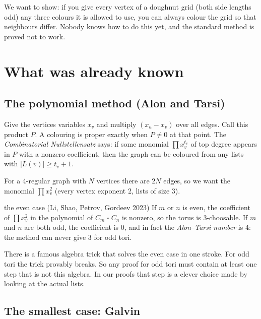 \documentclass[11pt,oneside,openany]{book}
\newcommand{\T}{\mathbin{\square}}
\begin{document}
\begin{plainwords}
We want to show: if you give every vertex of a doughnut grid (both side lengths odd) any three
colours it is allowed to use, you can always colour the grid so that neighbours differ. Nobody
knows how to do this yet, and the standard method is proved not to work.
\end{plainwords}

\chapter{What was already known}

\section{The polynomial method (Alon and Tarsi)}

Give the vertices variables $x_v$ and multiply $(x_u - x_v)$ over all edges. Call this product
$P$. A colouring is proper exactly when $P \neq 0$ at that point. The \emph{Combinatorial
Nullstellensatz} says: if some monomial $\prod x_v^{t_v}$ of top degree appears in $P$ with a
nonzero coefficient, then the graph can be coloured from any lists with $|L(v)| \ge t_v + 1$.

For a 4-regular graph with $N$ vertices there are $2N$ edges, so we want the monomial
$\prod x_v^2$ (every vertex exponent 2, lists of size 3).

\begin{proved}{the even case (Li, Shao, Petrov, Gordeev 2023)}
If $m$ or $n$ is even, the coefficient of $\prod x_v^2$ in the polynomial of $C_m \T C_n$ is
nonzero, so the torus is 3-choosable. If $m$ and $n$ are both odd, the coefficient is $0$, and in
fact the \emph{Alon--Tarsi number} is 4: the method can never give 3 for odd tori.
\end{proved}

\begin{plainwords}
There is a famous algebra trick that solves the even case in one stroke. For odd tori the trick
provably breaks. So any proof for odd tori must contain at least one step that is not this
algebra. In our proofs that step is a clever choice made by looking at the actual lists.
\end{plainwords}

\section{The smallest case: Galvin}
\end{document}
